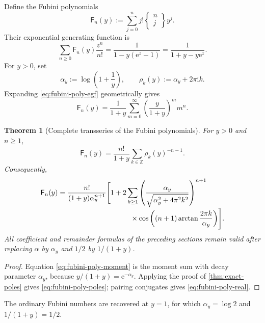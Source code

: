 \documentclass[11pt,a4paper]{article}
\newtheorem{theorem}{Theorem}[section]
\theoremstyle{definition}
\theoremstyle{remark}
\newcommand{\Fub}{\mathsf F}
\newcommand{\Stirling}[2]{\left\{\!\!\begin{matrix}#1\\#2\end{matrix}\!\!\right\}}
\newcommand{\e}{\mathrm e}
\newcommand{\ii}{\mathrm i}
\newcommand{\Z}{\mathbb Z}
\begin{document}
Define the Fubini polynomials
\begin{equation}\label{eq:fubini-poly-def}
 \Fub_n(y):=\sum_{j=0}^n j!\Stirling{n}{j}y^j.
\end{equation}
Their exponential generating function is
\begin{equation}\label{eq:fubini-poly-egf}
 \sum_{n\ge0}\Fub_n(y)\frac{z^n}{n!}
 =\frac1{1-y(\e^z-1)}
 =\frac1{1+y-y\e^z}.
\end{equation}
For \(y>0\), set
\begin{equation}\label{eq:alpha-y}
 \alpha_y:=\log\left(1+\frac1y\right),
 \qquad
 \rho_k(y):=\alpha_y+2\pi\ii k.
\end{equation}
Expanding \eqref{eq:fubini-poly-egf} geometrically gives
\begin{equation}\label{eq:fubini-poly-moment}
 \Fub_n(y)=\frac1{1+y}
 \sum_{m=0}^{\infty}
 \left(\frac{y}{1+y}\right)^m m^n.
\end{equation}

\begin{theorem}[Complete transseries of the Fubini polynomials]\label{thm:fubini-poly}
For \(y>0\) and \(n\ge1\),
\begin{equation}\label{eq:fubini-poly-poles}
 \boxed{\displaystyle
 \Fub_n(y)=\frac{n!}{1+y}
 \sum_{k\in\Z}\rho_k(y)^{-n-1}}.
\end{equation}
Consequently,
\begin{align}
 \Fub_n(y)
 ={}&\frac{n!}{(1+y)\alpha_y^{n+1}}
 \Biggl[1+2\sum_{k\ge1}
 \left(\frac{\alpha_y}
 {\sqrt{\alpha_y^2+4\pi^2k^2}}\right)^{n+1}
 \nonumber\\[-1mm]
 &\hspace{31mm}\times
 \cos\left((n+1)\arctan\frac{2\pi k}{\alpha_y}\right)
 \Biggr].
 \label{eq:fubini-poly-real}
\end{align}
All coefficient and remainder formulas of the preceding sections remain valid
after replacing \(\alpha\) by \(\alpha_y\) and \(1/2\) by \(1/(1+y)\).
\end{theorem}

\begin{proof}
Equation \eqref{eq:fubini-poly-moment} is the moment sum with decay parameter
\(\alpha_y\), because
\(
 y/(1+y)=\e^{-\alpha_y}
\).  Applying the proof of \cref{thm:exact-poles} gives
\eqref{eq:fubini-poly-poles}; pairing conjugates gives
\eqref{eq:fubini-poly-real}.
\end{proof}

The ordinary Fubini numbers are recovered at \(y=1\), for which
\(\alpha_y=\log2\) and \(1/(1+y)=1/2\).
\end{document}
